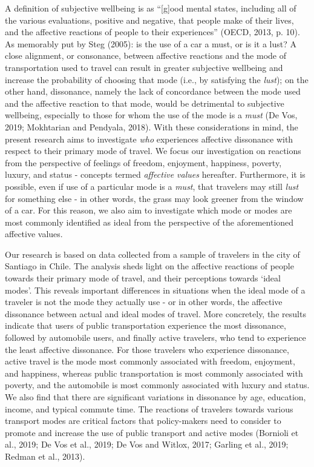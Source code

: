 \documentclass[]{elsarticle} %
\begin{document}
A definition of subjective wellbeing is as ``{[}g{]}ood mental states,
including all of the various evaluations, positive and negative, that
people make of their lives, and the affective reactions of people to
their experiences'' (OECD, 2013, p. 10). As memorably put by Steg
(2005): is the use of a car a must, or is it a lust? A close alignment,
or consonance, between affective reactions and the mode of
transportation used to travel can result in greater subjective wellbeing
and increase the probability of choosing that mode (i.e., by satisfying
the \emph{lust}); on the other hand, dissonance, namely the lack of
concordance between the mode used and the affective reaction to that
mode, would be detrimental to subjective wellbeing, especially to those
for whom the use of the mode is a \emph{must} (De Vos, 2019; Mokhtarian
and Pendyala, 2018). With these considerations in mind, the present
research aims to investigate \emph{who} experiences affective dissonance
with respect to their primary mode of travel. We focus our investigation
on reactions from the perspective of feelings of freedom, enjoyment,
happiness, poverty, luxury, and status - concepts termed \emph{affective
values} hereafter. Furthermore, it is possible, even if use of a
particular mode is a \emph{must}, that travelers may still \emph{lust}
for something else - in other words, the grass may look greener from the
window of a car. For this reason, we also aim to investigate which mode
or modes are most commonly identified as ideal from the perspective of
the aforementioned affective values.

Our research is based on data collected from a sample of travelers in
the city of Santiago in Chile. The analysis sheds light on the affective
reactions of people towards their primary mode of travel, and their
perceptions towards `ideal modes'. This reveals important differences in
situations when the ideal mode of a traveler is not the mode they
actually use - or in other words, the affective dissonance between
actual and ideal modes of travel. More concretely, the results indicate
that users of public transportation experience the most dissonance,
followed by automobile users, and finally active travelers, who tend to
experience the least affective dissonance. For those travelers who
experience dissonance, active travel is the mode most commonly
associated with freedom, enjoyment, and happiness, whereas public
transportation is most commonly associated with poverty, and the
automobile is most commonly associated with luxury and status. We also
find that there are significant variations in dissonance by age,
education, income, and typical commute time. The reactions of travelers
towards various transport modes are critical factors that policy-makers
need to consider to promote and increase the use of public transport and
active modes (Bornioli et al., 2019; De Vos et al., 2019; De Vos and
Witlox, 2017; Garling et al., 2019; Redman et al., 2013).
\end{document}
